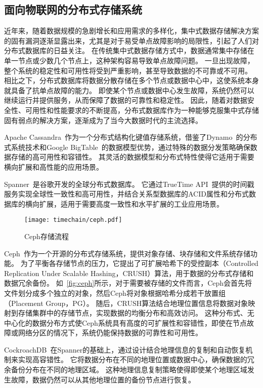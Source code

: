 \subsection{面向物联网的分布式存储系统}
近年来，随着数据规模的急剧增长和应用需求的多样化，集中式数据存储解决方案的固有漏洞逐渐显露出来，尤其是对于易受单点故障影响的局限性，引起了人们对分布式数据库的日益关注。
在传统集中式数据存储方式中，数据通常集中存储在单一节点或少数几个节点上，这种架构容易导致单点故障问题。
一旦出现故障，整个系统的稳定性和可用性将受到严重影响，甚至导致数据的不可靠或不可用。
相比之下，分布式数据库将数据分散存储在多个节点或数据中心中，这使系统本身就具备了抗单点故障的能力。
即使某个节点或数据中心发生故障，系统仍然可以继续运行并提供服务，从而保障了数据的可靠性和稳定性。
因此，随着对数据安全性、可用性和性能要求的不断提高，分布式数据库作为一种能够克服集中式存储固有弱点的解决方案，逐渐成为了当今大数据时代的主流选择。

Apache Cassandra~\cite{lakshman2010cassandra}作为一个分布式结构化键值存储系统，借鉴了Dynamo~\cite{decandia2007dynamo}的分布式系统技术和Google BigTable~\cite{chang2008bigtable}的数据模型优势，通过特殊的数据分发策略确保数据存储的高可用性和容错性。
其灵活的数据模型和分布式特性使得它适用于需要横向扩展和高性能的应用场景。

Spanner~\cite{corbett2013spanner}是谷歌开发的全球分布式数据库。
它通过TrueTime API~\cite{cervin2016truetime}提供的时间戳服务实现全球性一致性和高可用性，并结合关系型数据库的ACID属性和分布式数据库的横向扩展，适用于需要高度一致性和水平扩展的工业应用场景。

\begin{figure}[t]
    \centering
    \texttt{[image: timechain/ceph.pdf]}
    \caption{Ceph存储流程}
    \label{fig:ceph}
\end{figure}

Ceph~\cite{weil2006ceph}作为一个开源的分布式存储系统，提供对象存储、块存储和文件系统存储功能。
为了平衡各存储节点的压力，它提出了可扩展哈希下的受控副本（Controlled Replication Under Scalable Hashing，CRUSH）算法，用于数据的分布式存储和数据冗余备份。
如~\autoref{fig:ceph}所示，对于需要被存储的文件而言，Ceph会首先将文件划分成多个独立的对象，然后Ceph将对象根据哈希分成若干放置组（Placement Group，PG）。
随后，CRUSH算法结合地理位置信息将数据对象映射到存储集群中的存储节点，实现数据的均衡分布和高效访问。
这种分布式、无中心化的数据分布方式使Ceph系统具有高度的可扩展性和容错性，即使在节点故障或网络分区的情况下，系统仍能保持数据的可靠性和可用性。

CockroachDB~\cite{taft2020cockroachdb}在Spanner的基础上，通过设计结合地理信息的复制和自动恢复机制来实现高容错性。
它将数据分布在不同的地理位置或数据中心，确保数据的冗余备份分布在不同的地理区域。
这种地理信息复制策略使得即使某个地理区域发生故障，数据仍然可以从其他地理位置的备份节点进行恢复。

